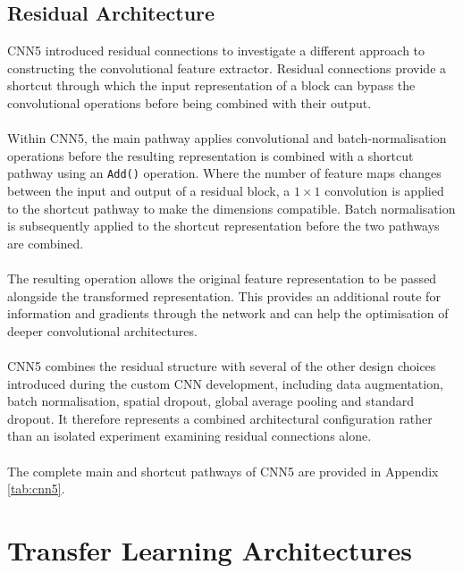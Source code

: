 \documentclass[12pt, a4paper]{report}
\let\oldsection\section
\renewcommand{\section}{%
    \Needspace{6\baselineskip}%
    \oldsection
}
\let\oldsubsection\subsection
\renewcommand{\subsection}{%
    \Needspace{6\baselineskip}%
    \oldsubsection
}
\begin{document}
			\subsection{Residual Architecture}
				
				CNN5 introduced residual connections to investigate a different approach to constructing the convolutional feature extractor. Residual connections provide a shortcut through which the input representation of a block can bypass the convolutional operations before being combined with their output.\\\\
				Within CNN5, the main pathway applies convolutional and batch-normalisation operations before the resulting representation is combined with a shortcut pathway using an \texttt{Add()} operation. Where the number of feature maps changes between the input and output of a residual block, a $1 \times 1$ convolution is applied to the shortcut pathway to make the dimensions compatible. Batch normalisation is subsequently applied to the shortcut representation before the two pathways are combined.\\\\
				The resulting operation allows the original feature representation to be passed alongside the transformed representation. This provides an additional route for information and gradients through the network and can help the optimisation of deeper convolutional architectures.\\\\
				CNN5 combines the residual structure with several of the other design choices introduced during the custom CNN development, including data augmentation, batch normalisation, spatial dropout, global average pooling and standard dropout. It therefore represents a combined architectural configuration rather than an isolated experiment examining residual connections alone.\\\\
				The complete main and shortcut pathways of CNN5 are provided in Appendix \ref{tab:cnn5}.

		\section{Transfer Learning Architectures}
		\label{sec:transfer_learning_architectures}
			
\end{document}
